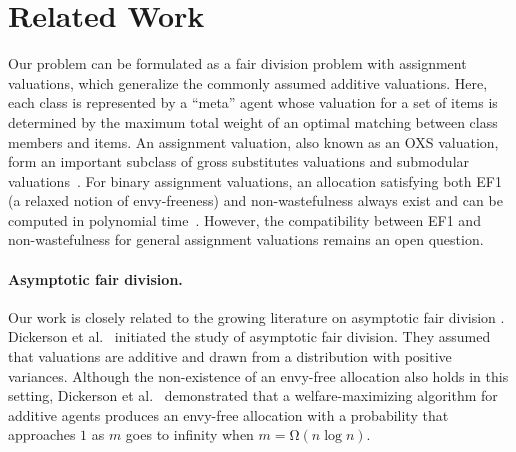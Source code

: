 \section{Related Work}
Our problem can be formulated as a fair division problem with assignment valuations, which generalize the commonly assumed additive valuations.
Here, each class is represented by a ``meta'' agent whose valuation for a set of items is determined by the maximum total weight of an optimal matching between class members and items.
An assignment valuation, also known as an OXS valuation, form an important subclass of gross substitutes valuations and submodular valuations~\cite{Lehmann2006,Leme2017}.
%
For binary assignment valuations, an allocation satisfying both EF1 (a relaxed notion of envy-freeness) and non-wastefulness always exist and can be computed in polynomial time~\cite{BabaioffEzraFeige2021,Benabbou2019,Benabbou2021}. 
However, the compatibility between EF1 and non-wastefulness for general assignment valuations remains an open question.
\fi

\paragraph{Asymptotic fair division.}
Our work is closely related to the growing literature on asymptotic fair division \cite{Amanatidis2017,BaiGolz2022,BaiEC2022,Dickerson2014,Kurokawa2016,ManurangsiSuksompong2017,ManurangsiSuksompong2020,ManurangsiSuksompong2021,Suksompong2016}. 
%
Dickerson et al.~\cite{Dickerson2014} initiated the study of asymptotic fair division. They assumed that valuations are additive and drawn from a distribution with positive variances. 
Although the non-existence of an envy-free allocation also holds in this setting, Dickerson et al.~\cite{Dickerson2014} demonstrated that a welfare-maximizing algorithm for additive agents produces an envy-free allocation with a probability that approaches $1$ as $m$ goes to infinity when $m=\mathrm{\Omega}(n\log n)$. 
%


